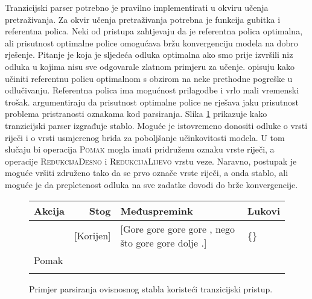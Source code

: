 Tranzicijski parser potrebno je pravilno implementirati u okviru učenja
pretraživanja. Za okvir učenja pretraživanja potrebna je funkcija gubitka i
referentna polica. Neki od pristupa zahtjevaju da je referentna polica
optimalna, ali prisutnost optimalne police omogućava bržu konvergenciju modela
na dobro rješenje. Pitanje je koja je sljedeća odluka optimalna ako smo prije
izvršili niz odluka u kojima nisu sve odgovarale zlatnom primjeru za učenje.
\citet{goldberg2013training} opisuju kako učiniti referentnu policu optimalnom s
obzirom na neke prethodne pogreške u odlučivanju. Referentna polica ima
mogućnost prilagodbe i vrlo mali vremenski trošak. \citet{andor2016globally}
argumentiraju da prisutnost optimalne police ne rješava jaku prisutnost problema
pristranosti oznakama kod parsiranja. Slika \ref{fig:shiftreduce} prikazuje kako
tranzicijski parser izgrađuje stablo. Moguće je istovremeno donositi odluke o
vrsti riječi i o vrsti usmjerenog brida za poboljšanje učinkovitosti modela. U
tom slučaju bi operacija \textsc{Pomak} mogla imati pridruženu oznaku vrste
riječi, a operacije \textsc{RedukcijaDesno} i \textsc{RedukcijaLijevo} vrstu
veze. Naravno, postupak je moguće vršiti združeno tako da se prvo označe vrste
riječi, a onda stablo, ali moguće je da prepletenost odluka na sve zadatke
dovodi do brže konvergencije.

\begin{figure}
  \centering
  \begin{tabular}{l|rll}
  \hline
  \multicolumn{1}{|l|}{Akcija} & Stog          & Međuspremink                                           & \multicolumn{1}{l|}{Lukovi} \\ \hline
                               & {[}Korijen{]} & {[}Gore gore gore gore , nego što gore gore dolje .{]} & \{\}                        \\
  Pomak                        &               &                                                        &                             \\
                               &               &                                                        &
  \end{tabular}
  \caption{Primjer parsiranja ovisnosnog stabla koristeći tranzicijski pristup.}
  \label{fig:shiftreduce}
\end{figure}

